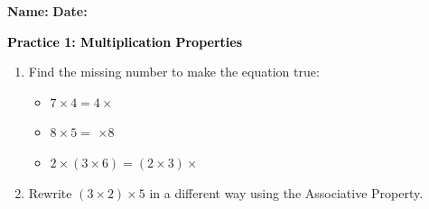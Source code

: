 \documentclass[12pt, letterpaper, fleqn]{article}
\newcommand{\blank}{\underline{\hspace{2.2cm}}}
\newcommand{\blanklong}{\underline{\hspace{6.5cm}}}
\begin{document}
\textbf{Name:} \underline{\hspace{5cm}}
\hfill
\textbf{Date:} \underline{\hspace{3cm}}\\

\begin{tcolorbox}[colback=customteal!20]
    \large\textcolor{black}{\textbf{Practice 1: Multiplication Properties}}
\end{tcolorbox}

\vspace{5mm}
\begin{enumerate}[itemsep=2cm, leftmargin=0.6cm]
\item Find the missing number to make the equation true:
\begin{itemize}[itemsep=1cm]
  \item $7 \times 4 = 4 \times$ \blank
  \item $8 \times 5 = $ \blank $\times 8$
  \item $2 \times (3 \times 6) = (2 \times 3) \times$ \blank
\end{itemize}

\item Rewrite $(3 \times 2) \times 5$ in a different way using the Associative Property.
\\ \\
\blanklong
\end{enumerate}
\end{document}
